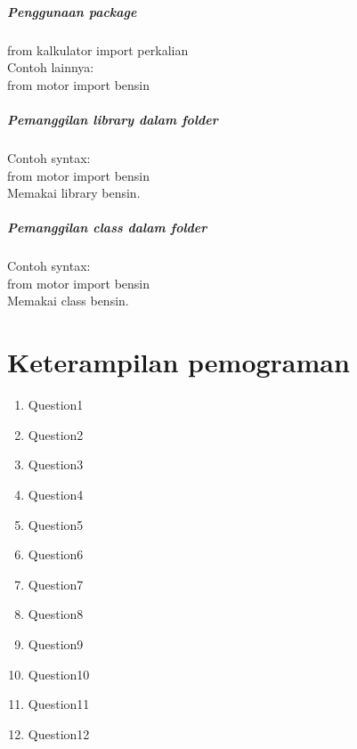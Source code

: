 \documentclass[a4paper,12pt]{report}
\begin{document}
\paragraph{Penggunaan package}
from kalkulator import perkalian\\
Contoh lainnya:\\
from motor import bensin\\
\paragraph{Pemanggilan library dalam folder}
Contoh syntax:\\
from motor import bensin\\
Memakai library bensin.\\
\paragraph{Pemanggilan class dalam folder}
Contoh syntax:\\
from motor import bensin\\
Memakai class bensin.\\
\chapter*{Keterampilan pemograman}
\begin{enumerate}
\item Question1

\item Question2

\item Question3

\item Question4

\item Question5

\item Question6

\item Question7

\item Question8

\item Question9

\item Question10

\item Question11

\item Question12

\end{enumerate}
\end{document}

